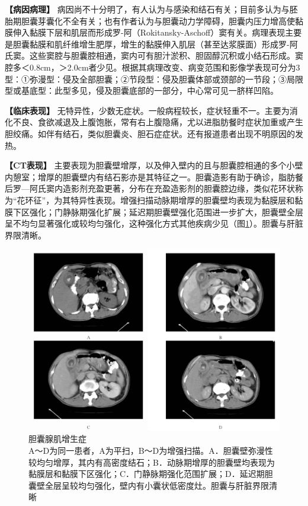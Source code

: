 \textbf{【病因病理】}
病因尚不十分明了，有人认为与感染和结石有关；目前多认为与胚胎期胆囊芽囊化不全有关；也有作者认为与胆囊动力学障碍，胆囊内压力增高使黏膜伸入黏膜下层和肌层而形成罗-阿（Rokitansky-Aschoff）窦有关。病理表现主要是胆囊黏膜和肌纤维增生肥厚，增生的黏膜伸入肌层（甚至达浆膜面）形成罗-阿氏窦。这些窦腔与胆囊腔相通，窦内可有胆汁淤积、胆固醇沉积或小结石形成。窦腔多＜0.8cm，＞2.0cm者少见。根据其病理改变、病变范围和影像学表现可分为3型：①弥漫型：侵及全部胆囊；②节段型：侵及胆囊体部或颈部的一节段；③局限型或基底型：此型多见，侵及胆囊底部的一部分，中心常可见一脐样凹陷。

\textbf{【临床表现】}
无特异性，少数无症状。一般病程较长，症状轻重不一。主要为消化不良、食欲减退及上腹饱胀，常有右上腹隐痛，尤以进脂肪餐时症状加重或产生胆绞痛。如伴有结石，类似胆囊炎、胆石症症状。还有报道患者出现不明原因的发热。

\textbf{【CT表现】}
主要表现为胆囊壁增厚，以及伸入壁内的且与胆囊腔相通的多个小壁内憩室；增厚的胆囊壁内有结石影亦是其特征之一。胆囊造影有助于确诊，脂肪餐后罗---阿氏窦内造影剂充盈更著，分布在充盈造影剂的胆囊腔边缘，类似花环状称为“花环征”，为其特异性表现。增强扫描动脉期增厚的胆囊壁均表现为黏膜层和黏膜下区强化；门静脉期强化扩展；延迟期胆囊壁强化范围进一步扩大，胆囊壁全层呈不均匀显著强化或较均匀强化，这种强化方式其他疾病少见（图\ref{fig12-6}）。胆囊与肝脏界限清晰。

\begin{figure}[!htbp]
 \centering
 \includegraphics[width=.7\textwidth,height=\textheight,keepaspectratio]{./images/Image00296.jpg}
 \captionsetup{justification=centering}
 \caption{胆囊腺肌增生症\\{\small A～D为同一患者，A为平扫，B～D为增强扫描。A．胆囊壁弥漫性较均匀增厚，其内有高密度结石；B．动脉期增厚的胆囊壁均表现为黏膜层和黏膜下区强化；C．门静脉期强化范围扩展；D．延迟期胆囊壁全层呈较均匀强化，壁内有小囊状低密度灶。胆囊与肝脏界限清晰}}
 \label{fig12-6}
  \end{figure} 

